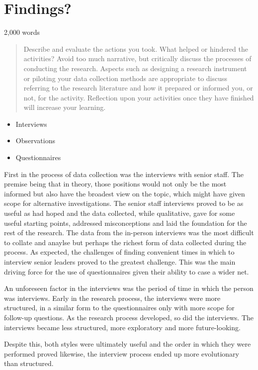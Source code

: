 \section{Findings?}
2,000 words 

\begin{quote}
Describe and evaluate the actions you took. What helped or hindered the activities? Avoid too much narrative, but critically discuss the processes of conducting the research. Aspects such as designing a research instrument or piloting your data collection methods are appropriate to discuss referring to the research literature and how it prepared or informed you, or not, for the activity. Reflection upon your activities once they have finished will increase your learning.
\end{quote}

\begin{itemize}
\item Interviews
\item Observations
\item Questionnaires 
\end{itemize}

First in the process of data collection was the interviews with senior staff. The premise being that in theory, those positions would not only be the most informed but also have the broadest view on the topic, which might have given scope for alternative investigations. The senior staff interviews proved to be as useful as had hoped and the data collected, while qualitative, gave for some useful starting points, addressed misconceptions and laid the foundation for the rest of the research. The data from the in-person interviews was the most difficult to collate and anaylse but perhaps the richest form of data collected during the process. As expected, the challenges of finding convenient times in which to interview senior leaders proved to the greatest challenge. This was the main driving force for the use of questionnaires given their ability to case a wider net. 

An unforeseen factor in the interviews was the period of time in which the person was interviews. Early in the research process, the interviews were more structured, in a similar form to the questionnaires only with more scope for follow-up questions. As the research process developed, so did the interviews. The interviews became less structured, more exploratory and more future-looking.

Despite this, both styles were ultimately useful and the order in which they were performed proved likewise, the interview process ended up more evolutionary than structured.

